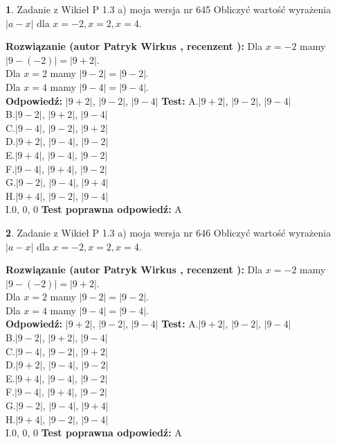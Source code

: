 \documentclass[12pt, a4paper]{article}
\theoremstyle{definition} %
\newtheorem{zad}{}
\newcommand{\zadStart}[1]{\begin{zad}#1\newline}
\newcommand{\zadStop}{\end{zad}}
\newcommand{\rozwStart}[2]{\noindent \textbf{Rozwiązanie (autor #1 , recenzent #2): }\newline}
\newcommand{\rozwStop}{\newline}
\newcommand{\odpStart}{\noindent \textbf{Odpowiedź:}\newline}
\newcommand{\odpStop}{\newline}
\newcommand{\testStart}{\noindent \textbf{Test:}\newline}
\newcommand{\testStop}{\newline}
\newcommand{\kluczStart}{\noindent \textbf{Test poprawna odpowiedź:}\newline}
\newcommand{\kluczStop}{\newline}
\begin{document}
\zadStart{Zadanie z Wikieł P 1.3 a) moja wersja nr 645}
Obliczyć wartość wyrażenia $|a - x|$ dla $x=-2,x=2,x=4$.
\zadStop
\rozwStart{Patryk Wirkus}{}
Dla $x = -2$ mamy $|9 - (-2)| = |9 + 2|$.\\
Dla $x = 2$ mamy $|9 - 2| = |9 - 2|$.\\
Dla $x = 4$ mamy $|9 - 4| = |9 - 4|$.\\
\rozwStop
\odpStart
$|9 + 2|$, $|9 - 2|$, $|9 - 4|$
\odpStop
\testStart
A.$|9 + 2|$, $|9 - 2|$, $|9 - 4|$\\
B.$|9 - 2|$, $|9 + 2|$, $|9 - 4|$\\
C.$|9 - 4|$, $|9 - 2|$, $|9 + 2|$\\
D.$|9 + 2|$, $|9 - 4|$, $|9 - 2|$\\
E.$|9 + 4|$, $|9 - 4|$, $|9 - 2|$\\
F.$|9 - 4|$, $|9 + 4|$, $|9 - 2|$\\
G.$|9 - 2|$, $|9 - 4|$, $|9 + 4|$\\
H.$|9 + 4|$, $|9 - 2|$, $|9 - 4|$\\
I.$0$, $0$, $0$
\testStop
\kluczStart
A
\kluczStop



\zadStart{Zadanie z Wikieł P 1.3 a) moja wersja nr 646}
Obliczyć wartość wyrażenia $|a - x|$ dla $x=-2,x=2,x=4$.
\zadStop
\rozwStart{Patryk Wirkus}{}
Dla $x = -2$ mamy $|9 - (-2)| = |9 + 2|$.\\
Dla $x = 2$ mamy $|9 - 2| = |9 - 2|$.\\
Dla $x = 4$ mamy $|9 - 4| = |9 - 4|$.\\
\rozwStop
\odpStart
$|9 + 2|$, $|9 - 2|$, $|9 - 4|$
\odpStop
\testStart
A.$|9 + 2|$, $|9 - 2|$, $|9 - 4|$\\
B.$|9 - 2|$, $|9 + 2|$, $|9 - 4|$\\
C.$|9 - 4|$, $|9 - 2|$, $|9 + 2|$\\
D.$|9 + 2|$, $|9 - 4|$, $|9 - 2|$\\
E.$|9 + 4|$, $|9 - 4|$, $|9 - 2|$\\
F.$|9 - 4|$, $|9 + 4|$, $|9 - 2|$\\
G.$|9 - 2|$, $|9 - 4|$, $|9 + 4|$\\
H.$|9 + 4|$, $|9 - 2|$, $|9 - 4|$\\
I.$0$, $0$, $0$
\testStop
\kluczStart
A
\kluczStop
\end{document}
